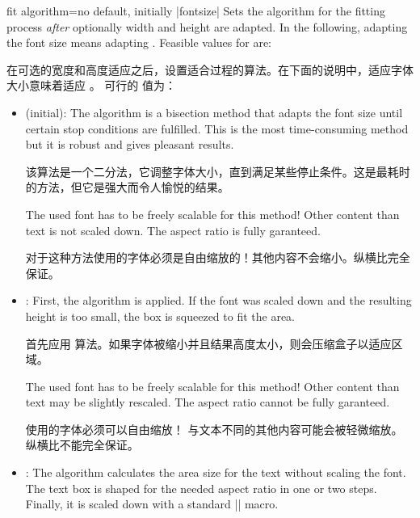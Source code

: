 %  

% 
% 

% 



\begin{docTcbKey}{fit algorithm}{=}{no default, initially |fontsize|}
Sets the algorithm for the fitting process \emph{after} optionally width and height
are adapted. In the following, adapting the font size means adapting
.
  Feasible values for  are:

在可选的宽度和高度适应之后，设置适合过程的算法。在下面的说明中，适应字体大小意味着适应 。
可行的  值为：
  \begin{itemize}
  \item{} (initial):
    The algorithm is a bisection method that adapts the font size until
    certain stop conditions are fulfilled. This is the most time-consuming
    method but it is robust and gives pleasant results.

    该算法是一个二分法，它调整字体大小，直到满足某些停止条件。这是最耗时的方法，但它是强大而令人愉悦的结果。
    \begin{marker}
    The used font has to be freely scalable for this method!
    Other content than text is not scaled down.
    The aspect ratio is fully garanteed.

    对于这种方法使用的字体必须是自由缩放的！其他内容不会缩小。纵横比完全保证。
    \end{marker}
  \item{}:
    First, the  algorithm is applied. If the font was scaled down
    and the resulting height is too small, the box is squeezed to fit the area.

    首先应用  算法。如果字体被缩小并且结果高度太小，则会压缩盒子以适应区域。
    \begin{marker}
    The used font has to be freely scalable for this method!
    Other content than text may be slightly rescaled.
    The aspect ratio cannot be fully garanteed.

使用的字体必须可以自由缩放！
与文本不同的其他内容可能会被轻微缩放。
纵横比不能完全保证。
    \end{marker}
  \item{}:
    The algorithm calculates the area size for the text without scaling the font.
    The text box is shaped for the needed aspect ratio in one or two
    steps. Finally, it is scaled down with a standard |\resizebox| macro.


\end{itemize}
\end{docTcbKey}
